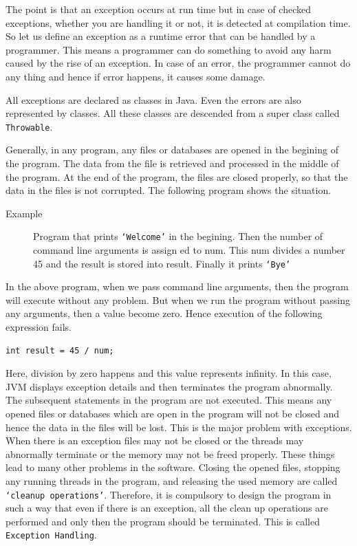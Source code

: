 \documentclass[11pt,a4paper]{article}
\begin{document}
The point is that an exception occurs at run time but in case of checked exceptions, whether you are handling it or not, it is detected at compilation time. So let us define an exception as a runtime error that can be handled by a programmer. This means a programmer can do something to avoid any harm caused by the rise of an exception. In case of an error, the programmer cannot do any thing and hence if error happens, it causes some damage.

All exceptions are declared as classes in Java. Even the errors are also represented by classes. All these classes are descended from a super class called \texttt{Throwable}.

Generally, in any program, any files or databases are opened in the begining of the program. The data from the file is retrieved and processed in the middle of the program. At the end of the program, the files are closed properly, so that the data in the files is not corrupted. The following program shows the situation.

\begin{description}
\item[Example] Program that prints \texttt{`Welcome'} in the begining. Then the number of command line arguments is assign ed to num. This num divides a number 45 and the result is stored into result. Finally it prints \texttt{`Bye'}

\end{description}
In the above program, when we pass command line arguments, then the program will execute without any problem. But when we run the program without passing any arguments, then a value become zero. Hence execution of the following expression fails.
\begin{lstlisting}[numbers=none]
int result = 45 / num;
\end{lstlisting}
Here, division by zero happens and this value represents infinity. In this case, JVM displays exception details and then terminates the program abnormally. The subsequent statements in the program are not executed. This means any opened files or databases which are open in the program will not be closed and hence the data in the files will be lost. This is the major problem with exceptions. When there is an exception files may not be closed or the threads may abnormally terminate or the memory may not be freed properly. These things lead to many other problems in the software. Closing the opened files, stopping any running threads in the program, and releasing the used memory are called \texttt{`cleanup operations'}. Therefore, it is compulsory to design the program in such a way that even if there is an exception, all the clean up operations are performed and only then the program should be terminated. This is called \texttt{Exception Handling}.
\end{document}
